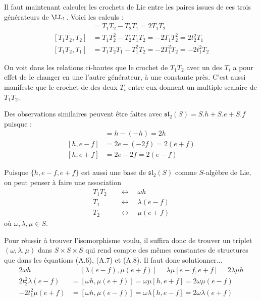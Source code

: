 Il faut maintenant calculer les crochets de Lie entre les paires issues de ces trois générateurs de $\LL_1$. Voici les calculs : 
\begin{align}
[T_1,T_2] &= T_1T_2 - T_2T_1 = 2T_1T_2 \tag{A.6}\\
[T_1T_2,T_2] &= T_1T_2^2-T_2T_1T_2 = -2T_1T_2^2 = 2t_2^2T_1 \tag{A.7}\\
[T_1T_2,T_1]&= T_1T_2T_1 - T_1^2T_2 = -2T_1^2T_2 = -2t_1^2T_2 \tag{A.8}
\end{align}
\addtocounter{laid}{3}

On voit dans les relations ci-hautes que le crochet de $T_1T_2$ avec un des $T_i$ a pour effet de le changer en une l'autre générateur, à une constante près. C'est aussi manifeste que le crochet de des deux $T_i$ entre eux donnent un multiple scalaire de $T_1T_2$.

Des observations similaires peuvent être faites avec $\mathfrak{sl}_2(S) = S.h + S.e + S.f$ puisque :
\begin{align*}
[e - f,e + f] &= h - (-h) = 2h\\
[h,e - f] &= 2e-(-2f) = 2(e + f)\\
[h,e + f] &= 2e - 2f = 2(e - f)
\end{align*}

Puisque $\{h, e - f, e + f\}$ est aussi une base de $\mathfrak{sl}_2(S)$ comme $S$-algèbre de Lie, on peut penser à faire une association 
\begin{align*}
T_1T_2 \quad &\longleftrightarrow \quad \omega h\\
T_1 \quad &\longleftrightarrow \quad \lambda (e - f)\\
T_2 \quad &\longleftrightarrow \quad \mu (e + f)
\end{align*}
où $\omega, \lambda, \mu \in S$.

Pour réussir à trouver l'isomorphisme voulu, il suffira donc de trouver un triplet $(\omega,\lambda,\mu)$ dans $S \times S \times S$ qui rend compte des mêmes constantes de structures que dans les équations (A.6), (A.7) et (A.8). Il faut donc solutionner...
\begin{align}
2 \omega h &= [\lambda(e - f), \mu(e + f)] = \lambda \mu [e - f, e + f] = 2 \lambda \mu h \tag{A.9}\\
2t_2^2 \lambda (e - f) &= [\omega h, \mu (e+f)] = \omega \mu [h, e + f]  = 2 \omega \mu (e - f) \tag{A.10}\\
-2t_1^2 \mu (e+f) &= [\omega h, \mu (e - f)] = \omega \lambda [h, e - f]  = 2 \omega \lambda (e + f) \tag{A.11}
\end{align}
\addtocounter{laid}{3}

